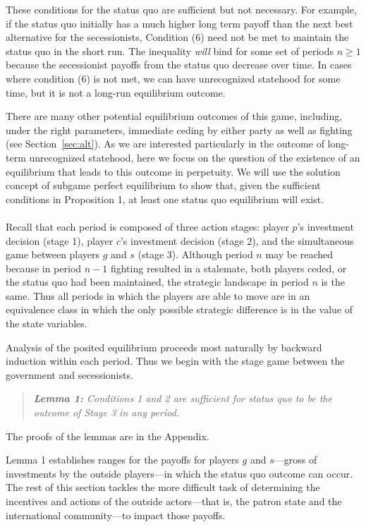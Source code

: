 \documentclass[12pt]{article}
\begin{document}
These conditions for the status quo are sufficient but not necessary. For example, if the status quo initially has a much higher long term payoff than the next best alternative for the secessionists, Condition (6) need not be met to maintain the status quo in the short run. The inequality \emph{will} bind for some set of periods $n \geq 1$ because the secessionist payoffs from the status quo decrease over time. In cases where condition (6) is not met, we can have unrecognized statehood for some time, but it is not a long-run equilibrium outcome.

There are many other potential equilibrium outcomes of this game, including, under the right parameters, immediate ceding by either party as well as fighting (see Section~\ref{sec:alt}). As we are interested particularly in the outcome of long-term unrecognized statehood, here we focus on the question of the existence of an equilibrium that leads to this outcome in perpetuity. We will use the solution concept of subgame perfect equilibrium to show that, given the sufficient conditions in Proposition 1, at least one status quo equilibrium will exist.\\

 \\
Recall that each period is composed of three action stages: player $p$'s investment decision (stage 1), player $c$'s investment decision (stage 2), and the simultaneous game between players $g$ and $s$ (stage 3). Although period $n$ may be reached because in period $n-1$ fighting resulted in a stalemate, both players ceded, or the status quo had been maintained, the strategic landscape in period $n$ is the same. Thus all periods in which the players are able to move are in an equivalence class in which the only possible strategic difference is in the value of the state variables.

Analysis of the posited equilibrium proceeds most naturally by backward induction within each period. Thus we begin with the stage game between the government and secessionists.

\begin{quotation}
\noindent \textit{{\bf Lemma 1:} Conditions 1 and 2 are sufficient for status quo to be the outcome of Stage 3 in any period.} 
\end{quotation}

The proofs of the lemmas are in the Appendix.

Lemma 1 establishes ranges for the payoffs for players $g$ and $s$---gross of investments by the outside players---in which the status quo outcome can occur. The rest of this section tackles the more difficult task of determining the incentives and actions of the outside actors---that is, the patron state and the international community---to impact those payoffs.
\end{document}
